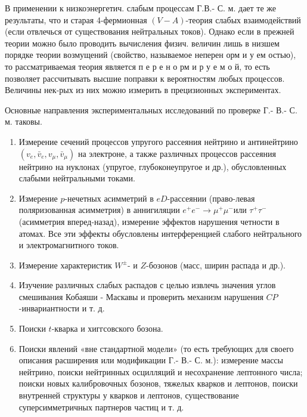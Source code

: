 \documentclass[10pt]{article}
\begin{document}
В применении к низкоэнергетич. слабым процессам Г.В.- С. м. дает те же результаты, что и старая 4-фермионная $(V-A)$-теория слабых взаимодействий (если отвлечься от существования нейтральных токов). Однако если в прежней теории можно было проводить вычисления физич. величин лишь в низшем порядке теории возмущений (свойство, называемое неперен орм и у ем остью), то рассматриваемая теория является п е р е н о рм и р у е м о й, то есть позволяет рассчитывать высшие поправки к вероятностям любых процессов. Величины нек-рых из них можно измерить в прецизионных экспериментах.



Основные направления экспериментальных исследований по проверке Г.- В.- С. м. таковы.



\begin{enumerate}

  \item Измерение сечений процессов упругого рассеяния нейтрино и антинейтрино $\left(v_{e}, \bar{v}_{e}, v_{\mu}, \bar{v}_{\mu}\right)$ на электроне, а также различных процессов рассеяния нейтрино на нуклонах (упругое, глубоконеупругое и др.), обусловленных слабыми нейтральными токами.



  \item Измерение $p$-нечетных асимметрий в $e D$-рассеянии (право-левая поляризованная асимметрия) в аннигиляции $e^{+} e^{-} \rightarrow \mu^{+} \mu^{-}$или $\tau^{+} \tau^{-}$(асимметрия вперед-назад), измерение эффектов нарушения четности в атомах. Все эти эффекты обусловлены интерференцией слабого нейтрального и электромагнитного токов.



  \item Измерение характеристик $W^{ \pm}$- и $Z$-бозонов (масс, ширин распада и др.).



  \item Изучение различных слабых распадов с целью извлечь значения углов смешивания Кобаяши - Маскавы и проверить механизм нарушения $C P$-инвариантности и т. д.



  \item Поиски $t$-кварка и хиггсовского бозона.



  \item Поиски явлений «вне стандартной модели» (то есть требующих для своего описания расширения или модификации Г.- В.- С. м.): измерение массы нейтрино, поиски нейтринных осцилляций и несохранение лептонного числа; поиски новых калибровочных бозонов, тяжелых кварков и лептонов, поиски внутренней структуры у кварков и лептонов, существование суперсимметричных партнеров частиц и т. д.



\end{enumerate}
\end{document}
